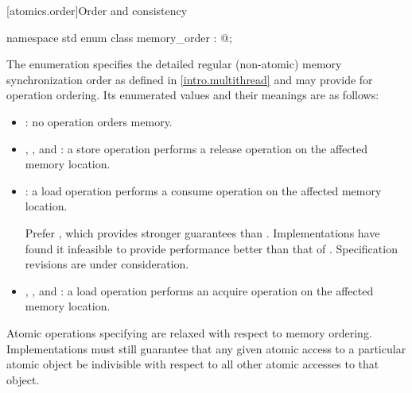 [atomics.order]{Order and consistency}
%
%
%
%
%
%
%
%
%
%
%
%
%

\begin{codeblock}
namespace std {
  enum class memory_order : @;
}
\end{codeblock}

\pnum
The enumeration  specifies the detailed regular
(non-atomic) memory synchronization order as defined in
\ref{intro.multithread} and may provide for operation ordering. Its
enumerated values and their meanings are as follows:

\begin{itemize}
\item {}: no operation orders memory.

\item {}, , and
: a store operation performs a release operation on the
affected memory location.

\item {}: a load operation performs a consume operation on the
affected memory location.
\begin{note}
Prefer , which provides stronger guarantees
than . Implementations have found it infeasible
to provide performance better than that of .
Specification revisions are under consideration.
\end{note}

\item {}, , and
: a load operation performs an acquire operation on the
affected memory location.
\end{itemize}

\begin{note}
Atomic operations specifying  are relaxed
with respect to memory ordering. Implementations must still guarantee that any
given atomic access to a particular atomic object be indivisible with respect
to all other atomic accesses to that object.
\end{note}

